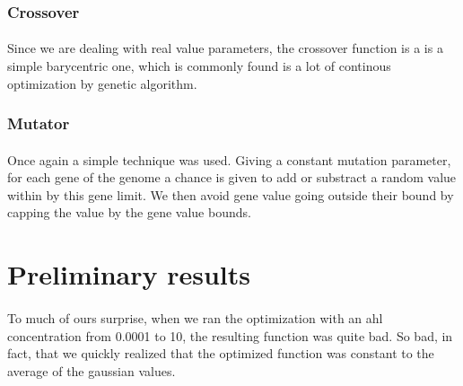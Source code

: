 \documentclass{article}
\begin{document}
    
    \subsubsection{Crossover} %
    \label{ssub:Crossover}
      
      \paragraph{} %
      \label{par:}
      
        Since we are dealing with real value parameters, the crossover function is a
        is a simple barycentric one, which is commonly found is a lot of continous
        optimization by genetic algorithm.

    
    
    \subsubsection{Mutator} %
    \label{ssub:Mutator}
    
      \paragraph{} %
      \label{par:}
        Once again a simple technique was used. Giving a constant mutation parameter,
        for each gene of the genome a chance is given to add or substract a random value
        within by this gene limit. We then avoid gene value going outside their bound by
        capping the value by the gene value bounds.

  \section{Preliminary results} %
  \label{sec:Preliminaty Result}
    
    \paragraph{} %
    \label{par:}
      To much of ours surprise, when we ran the optimization with an ahl concentration
      from 0.0001 to 10, the resulting function was quite bad. So bad, in fact, that
      we quickly realized that the optimized function was constant to the average of
      the gaussian values.
    
\end{document}
